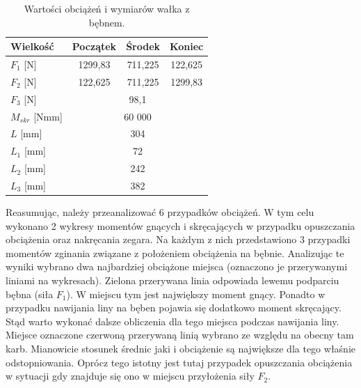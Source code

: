        		      		
       		
       		\begin{table}[h]
       			\centering
       			\begin{tabular}{l|c|c|c}
       				Wielkość & Początek & Środek & Koniec \\ \hline \hline
       				$F_1$ [N]& 1299,83 & 711,225 & 122,625 \\ 
       				$F_2$ [N]& 122,625 & 711,225 & 1299,83 \\ 
       				$F_3$ [N] & \multicolumn{3}{|c|}{98,1}\\
       				$M_{skr}$ [Nmm] &  \multicolumn{3}{|c|}{60 000} \\
       				$L$ [mm] & \multicolumn{3}{|c|}{304} \\
       				$L_1$ [mm] & \multicolumn{3}{|c|}{72}\\
       				$L_2$ [mm]  & \multicolumn{3}{|c|}{242} \\
       				$L_3$ [mm]  & \multicolumn{3}{|c|}{382} \\
       				
       				\hline
       			\end{tabular}
       			\caption{Wartości obciążeń i wymiarów wałka z bębnem.}
       			\label{tab::beben}
       		\end{table}
        	
        	Reasumując, należy przeanalizować 6 przypadków obciążeń.
        	W tym celu wykonano 2 wykresy momentów gnących i skręcających w przypadku opuszczania obciążenia oraz nakręcania zegara.
        	Na każdym z nich przedstawiono 3 przypadki momentów zginania związane z położeniem obciążenia na bębnie.
        	Analizując te wyniki wybrano dwa najbardziej obciążone miejsca (oznaczono je przerywanymi liniami na wykresach).
        	Zielona przerywana linia odpowiada lewemu podparciu bębna (siła $F_1$).
        	W miejscu tym jest największy moment gnący.
        	Ponadto w przypadku nawijania liny na bęben pojawia się dodatkowo moment skręcający.
        	Stąd warto wykonać dalsze obliczenia dla tego miejsca podczas nawijania liny.
        	Miejsce oznaczone czerwoną przerywaną linią wybrano ze względu na obecny tam karb.
        	Mianowicie stosunek średnic jaki i obciążenie są największe dla tego właśnie odstopniowania.
        	Oprócz tego istotny jest tutaj przypadek opuszczania obciążenia w sytuacji gdy znajduje się ono w miejscu przyłożenia siły $F_2$.
        	
